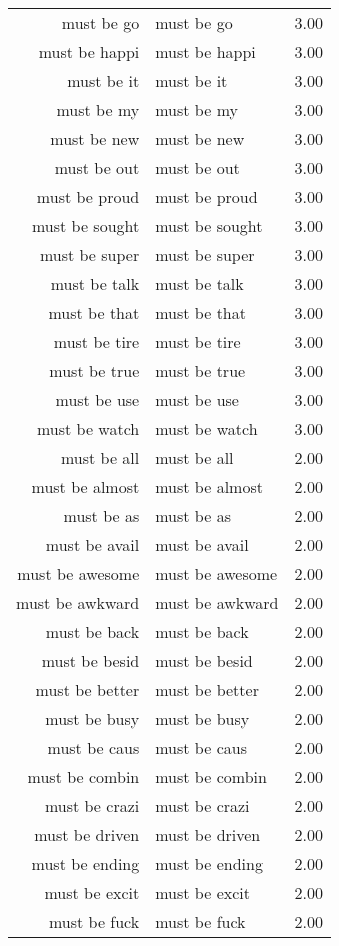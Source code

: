 \begin{table}[ht]
\begin{tabular}{rlr}
  must be go & must be go & 3.00 \\ 
  must be happi & must be happi & 3.00 \\ 
  must be it & must be it & 3.00 \\ 
  must be my & must be my & 3.00 \\ 
  must be new & must be new & 3.00 \\ 
  must be out & must be out & 3.00 \\ 
  must be proud & must be proud & 3.00 \\ 
  must be sought & must be sought & 3.00 \\ 
  must be super & must be super & 3.00 \\ 
  must be talk & must be talk & 3.00 \\ 
  must be that & must be that & 3.00 \\ 
  must be tire & must be tire & 3.00 \\ 
  must be true & must be true & 3.00 \\ 
  must be use & must be use & 3.00 \\ 
  must be watch & must be watch & 3.00 \\ 
  must be all & must be all & 2.00 \\ 
  must be almost & must be almost & 2.00 \\ 
  must be as & must be as & 2.00 \\ 
  must be avail & must be avail & 2.00 \\ 
  must be awesome & must be awesome & 2.00 \\ 
  must be awkward & must be awkward & 2.00 \\ 
  must be back & must be back & 2.00 \\ 
  must be besid & must be besid & 2.00 \\ 
  must be better & must be better & 2.00 \\ 
  must be busy & must be busy & 2.00 \\ 
  must be caus & must be caus & 2.00 \\ 
  must be combin & must be combin & 2.00 \\ 
  must be crazi & must be crazi & 2.00 \\ 
  must be driven & must be driven & 2.00 \\ 
  must be ending & must be ending & 2.00 \\ 
  must be excit & must be excit & 2.00 \\ 
  must be fuck & must be fuck & 2.00 \\ 

\end{tabular}
\end{table}

